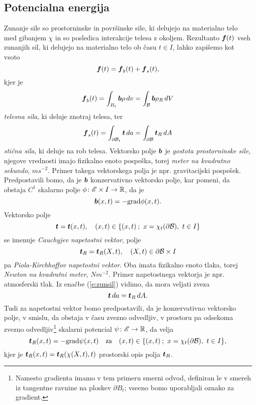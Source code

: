 \subsection{Potencialna energija}


Zunanje sile so prostorninske in površinske sile, ki delujejo na materialno telo med gibanjem $\chi$
in so posledica interakcije telesa z okoljem. Rezultanto $\boldsymbol f(t)$ vseh zunanjih sil, ki delujejo
na materialno telo ob času $t\in I$, lahko zapišemo kot vsoto
\[
	\boldsymbol f(t)=\boldsymbol f_b(t)+\boldsymbol f_s(t),
\]
kjer je
\[
	\boldsymbol f_b(t)=\int_{B_t}\boldsymbol b\rho\, dv=\int_{\mathcal B}\boldsymbol b\rho_R\, dV
\]
\emph{telesna sila}, ki deluje znotraj telesa, ter
\begin{equation}\label{e:zunsil}
	\boldsymbol f_s(t)=\int_{\partial \mathcal B_t}\boldsymbol t\, da=\int_{\partial \mathcal B}\boldsymbol t_R\, dA
\end{equation}
\emph{stična sila}, ki deluje na rob telesa.
Vektorsko polje $\boldsymbol b$ je \emph{gostota prostorninske sile}, njegove vrednosti imajo fizikalno enoto
pospeška, torej \textit{meter na kvadratno sekundo}, $ms^{-2}$. Primer takega vektorskega polja
je npr. gravitacijski pospešek. Predpostavili bomo, da je $\boldsymbol b$ konzervativno vektorsko polje,
kar pomeni, da obstaja $C^1$ skalarno polje $\phi\colon\mathscr E\times I\to\mathbb R$, da je
\begin{equation*} \label{e:gps}
	\boldsymbol b(x,t)=-\mathrm{grad}\phi(x,t).
\end{equation*}
Vektorsko polje
\begin{equation*} \label{e:csv}
	\boldsymbol t=\boldsymbol t(x,t),\quad (x,t)\in \{(x,t)\:;\ x=\chi_t(\partial \mathcal B),\ t\in I\}
\end{equation*}
se imenuje \emph{Cauchyjev napetostni vektor}, polje
\begin{equation*} \label{e:pksv}
	\boldsymbol t_R=\boldsymbol t_R(X,t),\quad (X,t)\in \partial \mathcal B\times I
\end{equation*}
pa \emph{Piola-Kirchhoffov napetostni vektor}. Oba
imata fizikalno enoto tlaka, torej \textit{Newton na kvadratni meter}, $Nm^{-2}$.
Primer napetostnega vektorja je npr. atmosferski tlak.
Iz enačbe (\ref{e:zunsil}) vidimo, da mora veljati zveza
\begin{equation}\label{e:ttr}
	\boldsymbol t\, da=\boldsymbol t_R\, dA.
\end{equation}
Tudi za napetostni vektor bomo predpostavili, da je konzervativno vektorsko polje, v smislu,
da obstaja v času zvezno odvedljiv, v prostoru pa odsekoma zvezno odvedljiv\footnote{Namesto gradienta imamo v tem primeru
smerni odvod, definiran le v smereh iz tangentne ravnine na ploskev $\partial B_t$; vseeno bomo uporabljali oznako za gradient.}
skalarni potencial $\psi\colon\mathscr E\to\mathbb R$, da velja
\[ \boldsymbol t_R(x,t)=-\mathrm{grad}\psi(x,t)\quad\textrm{za}\quad (x,t)\in \{(x,t)\:;\ x=\chi_t(\partial \mathcal B),\ t\in I\}, \]
kjer je $\boldsymbol t_R(x,t)=\boldsymbol t_R(\chi(X,t),t)$ prostorski opis polja $\boldsymbol t_R$.

